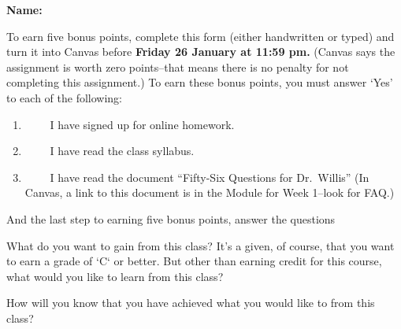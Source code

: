 \documentclass[12pt,fleqn]{exam}
\newcommand\PM{{\sc pm}}
\newcommand{\term}{Spring }
\begin{document}
\large
\vspace{0.1in}
\noindent{}
{\bf Name:}  \\
\noindent \makebox[3.0truein][l]{\bf Bonus Homework  \term \/ \the\year}
\vspace{0.1in}

\noindent  To earn five bonus points, complete this form (either handwritten or typed) and turn it into Canvas before 
\textbf{Friday 26 January  at 11:59 \PM.}  (Canvas says the assignment is worth zero points--that means there is no penalty for
not completing this assignment.) To earn these bonus points, you must answer `Yes' to each of the following:

\begin{enumerate}

\item \underline{$\phantom{YES}$} I have signed up for online homework. 
 
\item \underline{$\phantom{YES}$} I have read the class syllabus.

\item  \underline{$\phantom{YES}$} I have read the document ``Fifty-Six Questions for Dr.\ Willis''  (In Canvas, a link to this
document is in the Module for Week 1--look for FAQ.)

\end{enumerate}
And the last step to earning five bonus points, answer the questions

\begin{questions}

\question What do you want to gain from this class?  It's a given, of course, that you want to earn a grade of `C` or better. But other than earning credit for this course, what would you like to learn from this class?

\begin{solution}[1.5in]

\end{solution}

\question How will you know that you have achieved what you would like to from this class?  
\end{questions}
\end{document}

